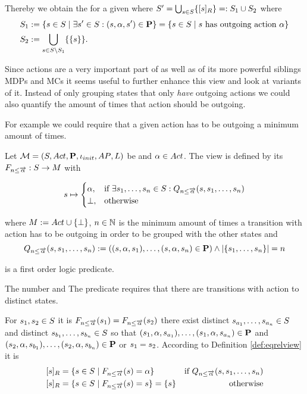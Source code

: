 \documentclass[preview]{standalone}
\begin{document}
Thereby we obtain the \viewN \viewhasoutaction for a given \chgphN \chgph where ${S}' = \bigcup_{{s} \in {S}} \{{{[{s}]_{{R}}}}\} =: {S}_1 \cup {S}_2$ where
\begin{align*}
	 {S}_1 &:= \{{s} \in {S} \mid \exists {s}' \in {S}: ({s}, {\alpha}, {s}') \in {\ensuremath{{\textbf{P}}}}\} = \{{s} \in {S} \mid {s} \text{ has outgoing action \ensuremath{{\alpha}}}\} \\
	{S}_2 &:= {\bigcup_{{s} \in {S} \setminus {S}_1}\{\{{s}\}\}}.
\end{align*}


Since actions are a very important part of \chgphsN as well as of its more powerful siblings MDPs and MCs it seems useful to further enhance this view and look at variants of it. Instead of only grouping states that only \emph{have} outgoing actions we could also quantify the amount of times that action should be outgoing.

For example we could require that a given action has to be outgoing a minimum amount of times. 

\begin{definition}
	Let ${{{\mathcal{M}}}} = {{({S}, {Act}, {\textbf{P}}, {\iota_{init}}, {AP}, {L})}}$ be \achgphN and ${\alpha} \in {Act}$. The view \viewminoutaction is defined by its \grpfctN ${{F_{{n}\leq{\overrightarrow{\ensuremath{{\alpha}}}}}}} : {S} \to {M}$ with
	
	\[
	{s} \mapsto
	\begin{cases}
		{\alpha},				& \text{if } \exists {s}_1, \dots, {s}_{n} \in {S}:  {Q_{{n}\leq{\overrightarrow{\ensuremath{{\alpha}}}}}({s},{s}_1, \dots, {s}_{{n}})}\\
		{\bot},          	& \text{otherwise}
	\end{cases}
	\]
	
	where ${{M}} := {{Act} \cup {\{\bot\}}}$, ${n} \in {\mathbb{N}}$ is the minimum amount of times a transition with action \action has to be outgoing in order to be grouped with the other states and
	\[
	{Q_{{n}\leq{\overrightarrow{\ensuremath{{\alpha}}}}}({s},{s}_1, \dots, {s}_{{n}})} := (({s}, {\alpha}, {s}_1), \dots, ({s}, {\alpha}, {s}_{n}) \in {\ensuremath{{\textbf{P}}}}) \land |\{{s}_1, \dots, {s}_{n}\}| = {n}
	\]
	
	is a first order logic predicate.
	\label{def:minoutaction}
\end{definition}

The number  and  
The predicate \predminoutact requires that there are transitions with action \action to \numoutact distinct states.

For ${s}_1,{s}_2 \in {S}$ it is ${{F_{{n}\leq{\overrightarrow{\ensuremath{{\alpha}}}}}}}({s}_1) = {{F_{{n}\leq{\overrightarrow{\ensuremath{{\alpha}}}}}}}({s}_2)$ \iffN there exist distinct ${s}_{a_1}, \dots, {s}_{a_{n}} \in {S}$ and distinct ${s}_{b_1}, \dots, {s}_{b_{n}} \in {S}$ so that $({s}_1, {\alpha}, {s}_{a_1}), \dots, ({s}_1, {\alpha}, {s}_{a_{n}}) \in {\ensuremath{{\textbf{P}}}}$ and $({s}_2, {\alpha}, {s}_{b_1}), \dots, ({s}_2, {\alpha}, {s}_{b_{n}}) \in {\ensuremath{{\textbf{P}}}}$ or ${s}_1 = {s}_2$. According to Definition \ref{def:eqrelview} it is 
\begin{align*}
	\eqclassv &= \{\state \in \states \mid \gfctminoutaction(\state) = \action\} &\text{if } \predminoutact \\ 
	\eqclassv &= \{\state \in \states \mid \gfctminoutaction(\state) = \state\} = \{\state\} &\text{ otherwise}
\end{align*}
\end{document}
